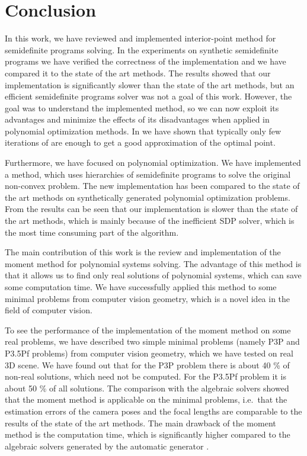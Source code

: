 \chapter{Conclusion}
In this work, we have reviewed and implemented interior-point method for semidefinite programs solving.
In the experiments on synthetic semidefinite programs we have verified the correctness of the implementation and we have compared it to the state of the art methods.
The results showed that our implementation is significantly slower than the state of the art methods, but an efficient semidefinite programs solver was not a goal of this work.
However, the goal was to understand the implemented method, so we can now exploit its advantages and minimize the effects of its disadvantages when applied in polynomial optimization methods.
In  we have shown that typically only few iterations of  are enough to get a good approximation of the optimal point.

Furthermore, we have focused on polynomial optimization.
We have implemented a method, which uses hierarchies of semidefinite programs to solve the original non-convex problem.
The new implementation has been compared to the state of the art methods on synthetically generated polynomial optimization problems.
From the results can be seen that our implementation is slower than the state of the art methods, which is mainly because of the inefficient SDP solver, which is the most time consuming part of the algorithm.

The main contribution of this work is the review and implementation of the moment method for polynomial systems solving.
The advantage of this method is that it allows us to find only real solutions of polynomial systems, which can save some computation time.
We have successfully applied this method to some minimal problems from computer vision geometry, which is a novel idea in the field of computer vision.

To see the performance of the implementation of the moment method on some real problems, we have described two simple minimal problems (namely P3P and P3.5Pf problems) from computer vision geometry, which we have tested on real 3D scene.
We have found out that for the P3P problem there is about 40 \% of non-real solutions, which need not be computed.
For the P3.5Pf problem it is about 50 \% of all solutions.
The comparison with the algebraic solvers showed that the moment method is applicable on the minimal problems, i.e.\ that the estimation errors of the camera poses and the focal lengths are comparable to the results of the state of the art methods.
The main drawback of the moment method is the computation time, which is significantly higher compared to the algebraic solvers generated by the automatic generator \cite{autogen}.

